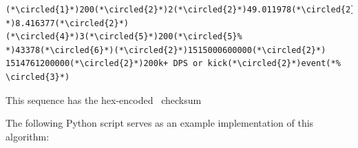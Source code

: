 \documentclass[parskip=full,11pt]{scrartcl}
\begin{document}
\begin{lstlisting}[language=norm,firstnumber=1]
(*\circled{1}*)200(*\circled{2}*)2(*\circled{2}*)49.011978(*\circled{2}%
*)8.416377(*\circled{2}*)(*\circled{4}*)3(*\circled{5}*)200(*\circled{5}%
*)43378(*\circled{6}*)(*\circled{2}*)1515000600000(*\circled{2}*)
1514761200000(*\circled{2}*)200k+ DPS or kick(*\circled{2}*)event(*%
\circled{3}*)
\end{lstlisting}

This sequence has the hex-encoded \hashAlg~checksum\
\

\par The following Python script serves as an example implementation of this
algorithm:

\end{document}
